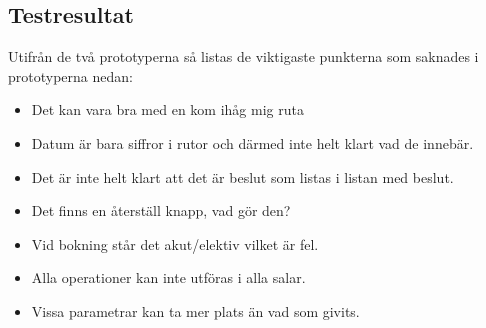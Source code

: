 \documentclass[a4paper,10pt]{article}
\begin{document}
\subsection{Testresultat}
Utifrån de två prototyperna så listas de viktigaste punkterna som saknades i prototyperna nedan:
\begin{itemize}
\item Det kan vara bra med en kom ihåg mig ruta
\item Datum är bara siffror i rutor och därmed inte helt klart vad de innebär.
\item Det är inte helt klart att det är beslut som listas i listan med beslut.
\item Det finns en återställ knapp, vad gör den?
\item Vid bokning står det akut/elektiv vilket är fel.
\item Alla operationer kan inte utföras i alla salar.
\item Vissa parametrar kan ta mer plats än vad som givits.

\end{itemize}
\end{document}
